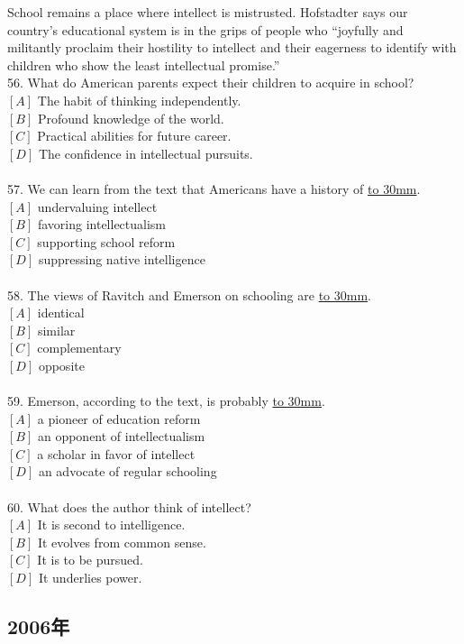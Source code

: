 \documentclass[a4paper]{article}
\begin{document}
\par
School remains a place where intellect is mistrusted. Hofstadter says our country’s educational system is in the grips of people who “joyfully and militantly proclaim their hostility to intellect and their eagerness to identify with children who show the least intellectual promise.”
\\56.	What do American parents expect their children to acquire in school?\\$[A]$ The habit of thinking independently.\\$[B]$ Profound knowledge of the world.\\$[C]$ Practical abilities for future career.\\$[D]$ The confidence in intellectual pursuits.\\\\57.	We can learn from the text that Americans have a history of \underline{\hbox to 30mm{}}.\\$[A]$ undervaluing intellect\\$[B]$ favoring intellectualism\\$[C]$ supporting school reform\\$[D]$ suppressing native intelligence\\\\58.	The views of Ravitch and Emerson on schooling are \underline{\hbox to 30mm{}}.\\$[A]$ identical\\$[B]$ similar\\$[C]$ complementary\\$[D]$ opposite\\\\59.	Emerson, according to the text, is probably \underline{\hbox to 30mm{}}.\\$[A]$ a pioneer of education reform\\$[B]$ an opponent of intellectualism\\$[C]$ a scholar in favor of intellect\\$[D]$ an advocate of regular schooling\\\\60.	What does the author think of intellect?\\$[A]$ It is second to intelligence.\\$[B]$ It evolves from common sense.\\$[C]$ It is to be pursued.\\$[D]$ It underlies power.\\\subsection{2006年}
\end{document}
